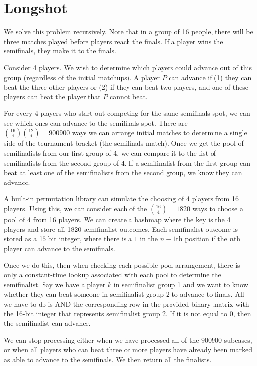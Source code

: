 \documentclass{article}
\begin{document}
\section{Longshot}
We solve this problem recursively. Note that in a group of 16 people, there will be three matches played before players reach the finals. If a player wins the semifinals, they make it to the finals.
\par 
Consider 4 players. We wish to determine which players could advance out of this group (regardless of the initial matchups). A player $P$ can advance if (1) they can beat the three other players or (2) if they can beat two players, and one of these players can beat the player that $P$ cannot beat. 
\par 
For every 4 players who start out competing for the same semifinals spot, we can see which ones can advance to the semifinals spot. There are $\binom{16}{4}\binom{12}{4}=900900$ ways we can arrange initial matches to determine a single side of the tournament bracket (the semifinals match). Once we get the pool of semifinalists from our first group of 4, we can compare it to the list of semifinalists from the second group of 4. If a semifinalist from the first group can beat at least one of the semifinalists from the second group, we know they can advance.
\par 
A built-in permutation library can simulate the choosing of 4 players from 16 players. Using this, we can consider each of the $\binom{16}{4}=1820$ ways to choose a pool of 4 from 16 players. We can create a hashmap where the key is the 4 players and store all 1820 semifinalist outcomes. Each semifinalist outcome is stored as a 16 bit integer, where there is a $1$ in the $n-1$th position if the $n$th player can advance to the semifinals.
\par 
Once we do this, then when checking each possible pool arrangement, there is only a constant-time lookup associated with each pool to determine the semifinalist. Say we have a player $k$ in semifinalist group 1 and we want to know whether they can beat someone in semifinalist group 2 to advance to finals. All we have to do is AND the corresponding row in the provided binary matrix with the 16-bit integer that represents semifinalist group 2. If it is not equal to 0, then the semifinalist can advance.
\par 
We can stop processing either when we have processed all of the $900900$ subcases, or when all players who can beat three or more players have already been marked as able to advance to the semifinals. We then return all the finalists.
\end{document}
